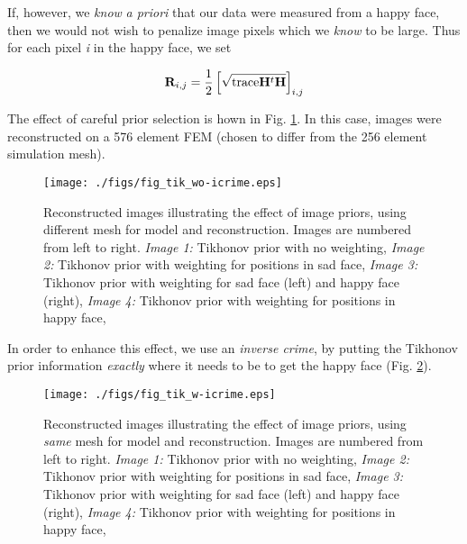 \documentclass[12pt]{iopart}
\begin{document}
If, however, we {\em know} {\em a priori} that 
our data were measured from a happy face, then we 
would not wish to penalize image pixels which we
{\em know} to be large. Thus for each pixel {\em i}
in the happy face, we set 

\begin{equation}
   {\bf R}_{i,j} = \frac{1}{2} \left[
              \sqrt{ \mathrm{trace} {\bf H}^t{\bf H} }
                               \right]_{i,j}
\end{equation}

The effect of careful prior selection is hown in
Fig. \ref{fig:tikprior}.
In this case, images were reconstructed on a 576 element
FEM (chosen to differ from the 256 element simulation mesh).


%
%
\begin{figure}[th]
\begin{flushright}
\texttt{[image: ./figs/fig\_tik\_wo-icrime.eps]}
\caption{\small 
Reconstructed images illustrating the effect of image priors,
using different mesh for model and reconstruction.
Images are numbered from left to right.
{\em Image 1:} Tikhonov prior with no weighting,
{\em Image 2:} Tikhonov prior with weighting for positions in sad face,
{\em Image 3:} Tikhonov prior with weighting for sad face (left) and
happy face (right),
{\em Image 4:} Tikhonov prior with weighting for positions in happy face,
 }
 \label{fig:tikprior}
\end{flushright}
\end{figure}

In order to enhance this effect, we use an {\em inverse crime},
by putting the Tikhonov prior information {\em exactly} where
it needs to be to get the happy face (Fig. \ref{fig:tikprior_icrime}).

%
%
\begin{figure}[th]
\begin{flushright}
\texttt{[image: ./figs/fig\_tik\_w-icrime.eps]}
\caption{\small 
Reconstructed images illustrating the effect of image priors,
using {\em same} mesh for model and reconstruction.
Images are numbered from left to right.
{\em Image 1:} Tikhonov prior with no weighting,
{\em Image 2:} Tikhonov prior with weighting for positions in sad face,
{\em Image 3:} Tikhonov prior with weighting for sad face (left) and
happy face (right),
{\em Image 4:} Tikhonov prior with weighting for positions in happy face,
 }
 \label{fig:tikprior_icrime}
\end{flushright}
\end{figure}
\end{document}
